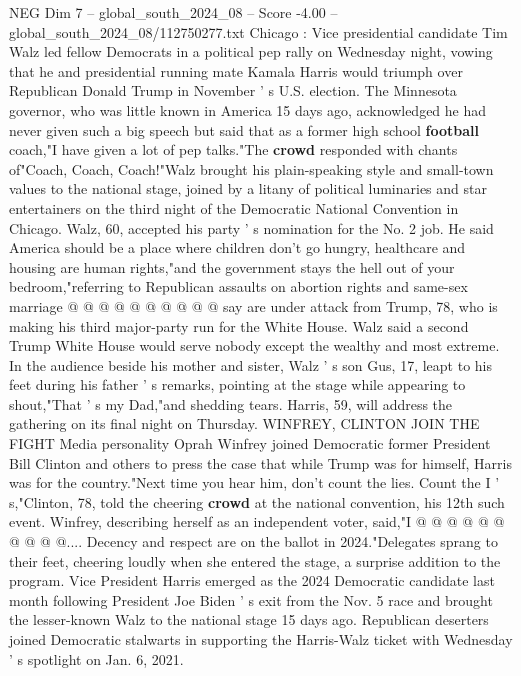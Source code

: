 \begin{textsample}{NEG Dim 7 – global\_south\_2024\_08 – Score -4.00 – global\_south\_2024\_08/112750277.txt}  \label{ex:f7_neg_378}
Chicago : Vice presidential candidate Tim Walz led fellow Democrats in a political pep rally on Wednesday night, vowing that he and presidential running mate Kamala Harris would triumph over Republican Donald Trump in November ' s U.S. election.
The Minnesota governor, who was little known in America 15 days ago, acknowledged he had never given such a big speech but said that as a former high school \textbf{football} coach,"I have given a lot of pep talks."The \textbf{crowd} responded with chants of"Coach, Coach, Coach!"Walz brought his plain-speaking style and small-town values to the national stage, joined by a litany of political luminaries and star entertainers on the third night of the Democratic National Convention in Chicago.
Walz, 60, accepted his party ' s nomination for the No. 2 job.
He said America should be a place where children don't go hungry, healthcare and housing are human rights,"and the government stays the hell out of your bedroom,"referring to Republican assaults on abortion rights and same-sex marriage @ @ @ @ @ @ @ @ @ @ say are under attack from Trump, 78, who is making his third major-party run for the White House.
Walz said a second Trump White House would serve nobody except the wealthy and most extreme.
In the audience beside his mother and sister, Walz ' s son Gus, 17, leapt to his feet during his father ' s remarks, pointing at the stage while appearing to shout,"That ' s my Dad,"and shedding tears.
Harris, 59, will address the gathering on its final night on Thursday.
WINFREY, CLINTON JOIN THE FIGHT Media personality Oprah Winfrey joined Democratic former President Bill Clinton and others to press the case that while Trump was for himself, Harris was for the country."Next time you hear him, don't count the lies.
Count the I ' s,"Clinton, 78, told the cheering \textbf{crowd} at the national convention, his 12th such event.
Winfrey, describing herself as an independent voter, said,"I @ @ @ @ @ @ @ @ @ @....
Decency and respect are on the ballot in 2024."Delegates sprang to their feet, cheering loudly when she entered the stage, a surprise addition to the program.
Vice President Harris emerged as the 2024 Democratic candidate last month following President Joe Biden ' s exit from the Nov. 5 race and brought the lesser-known Walz to the national stage 15 days ago.
Republican deserters joined Democratic stalwarts in supporting the Harris-Walz ticket with Wednesday ' s spotlight on Jan. 6, 2021.

\end{textsample}
